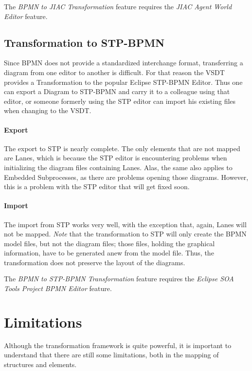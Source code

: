The \emph{BPMN to JIAC Transformation} feature requires the \emph{JIAC Agent World Editor} feature.


\subsection{Transformation to STP-BPMN}
\label{sec:user_trafo_stp}

Since BPMN does not provide a standardized interchange format, transferring a diagram from one editor to another is difficult.  For that reason the VSDT provides a Transformation to the popular Eclipse STP-BPMN Editor.  Thus one can export a Diagram to STP-BPMN and carry it to a colleague using that editor, or someone formerly using the STP editor can import his existing files when changing to the VSDT.

\paragraph{Export}
The export to STP is nearly complete. The only elements that are not mapped are Lanes, which is because the STP editor is encountering problems when initializing the diagram files containing Lanes.  Alas, the same also applies to Embedded Subprocesses, as there are problems opening those diagrams.  However, this is a problem with the STP editor that will get fixed soon.

\paragraph{Import}
The import from STP works very well, with the exception that, again, Lanes will not be mapped.
\emph{Note} that the transformation to STP will only create the BPMN model files, but not the diagram files; those files, holding the graphical information, have to be generated anew from the model file. Thus, the transformation does not preserve the layout of the diagrams.

The \emph{BPMN to STP-BPMN Transformation} feature requires the \emph{Eclipse SOA Tools Project BPMN Editor} feature.


\section{Limitations}
\label{sec:user_trafo_limits}

Although the transformation framework is quite powerful, it is important to understand that there are still some limitations, both in the mapping of structures and elements.

